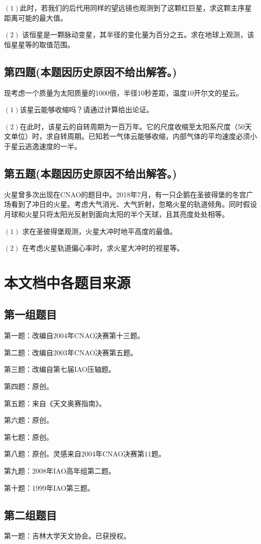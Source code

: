 \documentclass[a4paper,12pt]{report}
\begin{document}
$\left(1\right)$此时，若我们的后代用同样的望远镜也观测到了这颗红巨星，求这颗主序星距离可能的最大值。

$\left(2\right)$
该恒星是一颗脉动变星，其半径的变化量为百分之五。求在地球上观测，该恒星星等的取值范围。
\section{第四题(本题因历史原因不给出解答。)}
现考虑一个质量为太阳质量的1000倍，半径10秒差距，温度10开尔文的星云。

$\left(1\right)$该星云能够收缩吗？请通过计算给出论证。

$\left(2\right)$在此时，该星云的自转周期为一百万年。它的尺度收缩至太阳系尺度（50天文单位）时，求自转周期。已知若一气体云能够收缩，内部气体的平均速度必须小于星云逃逸速度的一半。
\section{第五题(本题因历史原因不给出解答。)}
火星曾多次出现在CNAO的题目中。2018年7月，有一只企鹅在圣彼得堡的冬宫广场看到了冲日的火星。考虑大气消光、大气折射，忽略火星的轨道倾角。同时假设月球和火星只将太阳光反射到面向太阳的半个天球，且其亮度处处相等。

$\left(1\right)$
求在圣彼得堡观测，火星大冲时地平高度的最值。

$\left(2\right)$
在考虑火星轨道偏心率时，求火星大冲时的视星等。




\chapter{本文档中各题目来源}
\section{第一组题目}
第一题：改编自2004年CNAO决赛第十三题。

第二题：改编自2003年CNAO决赛第五题。

第三题：改编自第七届IAO压轴题。

第四题：原创。

第五题：来自《天文奥赛指南》。

第六题：原创。

第七题：原创。

第八题：原创。灵感来自2004年CNAO决赛第11题。

第九题：2008年IAO高年组第二题。

第十题：1999年IAO第三题。
\section{第二组题目}
第一题：吉林大学天文协会。已获授权。
\end{document}
